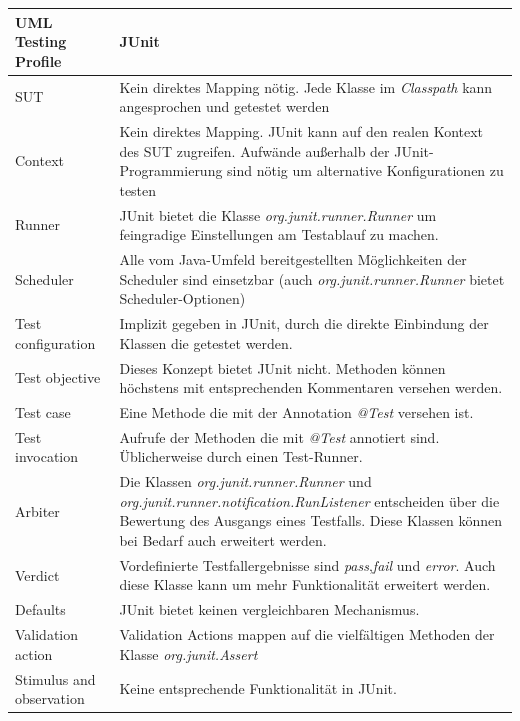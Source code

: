 \begin{table}[h]
\centering
\begin{tabular}
{ | l |p{9cm}|} \hline
\textbf{UML Testing Profile} & \textbf{JUnit} \\ \hline \Gls{SUT}                       & Kein direktes Mapping nötig. Jede Klasse im \textit{Classpath} kann angesprochen und getestet werden   \\ \hline
Context                   & Kein direktes Mapping. JUnit kann auf den realen Kontext des \Gls{SUT} zugreifen. Aufwände außerhalb der JUnit-Programmierung sind nötig um alternative Konfigurationen zu testen \\ \hline
Runner         			  & JUnit bietet die Klasse \textit{org.junit.runner.Runner} um feingradige Einstellungen am Testablauf zu machen. \\ \hline
Scheduler   & Alle vom Java-Umfeld bereitgestellten Möglichkeiten der Scheduler sind einsetzbar (auch \textit{org.junit.runner.Runner} bietet Scheduler-Optionen) \\ \hline
Test configuration        & Implizit gegeben in JUnit, durch die direkte Einbindung der Klassen die getestet werden. \\ \hline
Test objective            & Dieses Konzept bietet JUnit nicht. Methoden können höchstens mit entsprechenden Kommentaren versehen werden.\\ \hline
Test case                 & Eine Methode die mit der Annotation \textit{@Test} versehen ist. \\ \hline
Test invocation           & Aufrufe der Methoden die mit \textit{@Test} annotiert sind. Üblicherweise durch einen Test-Runner. \\ \hline
Arbiter                   & Die Klassen \textit{org.junit.runner.Runner} und \textit{org.junit.runner.notification.RunListener} entscheiden über die Bewertung des Ausgangs eines Testfalls. Diese Klassen können bei Bedarf auch erweitert werden. \\ \hline
Verdict                   & Vordefinierte Testfallergebnisse sind \textit{pass},\textit{fail} und \textit{error}. Auch diese Klasse kann um mehr Funktionalität erweitert werden. \\ \hline
Defaults                  & JUnit bietet keinen vergleichbaren Mechanismus.  \\ \hline
Validation action         & Validation Actions mappen auf die vielfältigen Methoden der Klasse \textit{org.junit.Assert} \\ \hline
Stimulus and observation  & Keine entsprechende Funktionalität in JUnit. \\ \hline

\end{tabular}
\end{table}
